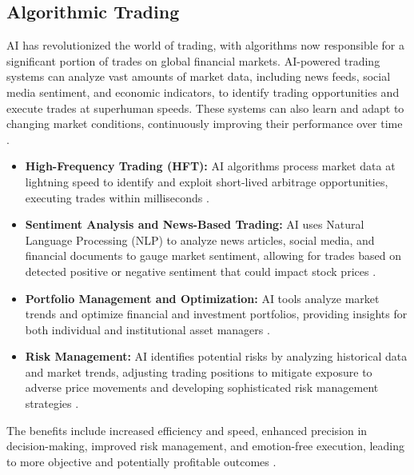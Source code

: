 \subsection{Algorithmic Trading}
AI has revolutionized the world of trading, with algorithms now responsible for a significant portion of trades on global financial markets. AI-powered trading systems can analyze vast amounts of market data, including news feeds, social media sentiment, and economic indicators, to identify trading opportunities and execute trades at superhuman speeds. These systems can also learn and adapt to changing market conditions, continuously improving their performance over time \cite{rustandi2025ai}.
\begin{itemize}
    \item \textbf{High-Frequency Trading (HFT):} AI algorithms process market data at lightning speed to identify and exploit short-lived arbitrage opportunities, executing trades within milliseconds \cite{IONGroup_AlgorithmicTrading, DigitalDefynd_AlgorithmicTrading}.
    \item \textbf{Sentiment Analysis and News-Based Trading:} AI uses Natural Language Processing (NLP) to analyze news articles, social media, and financial documents to gauge market sentiment, allowing for trades based on detected positive or negative sentiment that could impact stock prices \cite{IONGroup_AlgorithmicTrading, FinancialModelingPrep_AlgorithmicTrading}.
    \item \textbf{Portfolio Management and Optimization:} AI tools analyze market trends and optimize financial and investment portfolios, providing insights for both individual and institutional asset managers \cite{DataDynamicsInc_AlgorithmicTrading, IBM_AlgorithmicTrading}.
    \item \textbf{Risk Management:} AI identifies potential risks by analyzing historical data and market trends, adjusting trading positions to mitigate exposure to adverse price movements and developing sophisticated risk management strategies \cite{IONGroup_AlgorithmicTrading, BuiltIn_AlgorithmicTrading}.
\end{itemize}
The benefits include increased efficiency and speed, enhanced precision in decision-making, improved risk management, and emotion-free execution, leading to more objective and potentially profitable outcomes \cite{AlgosOne_AlgorithmicTrading}.

